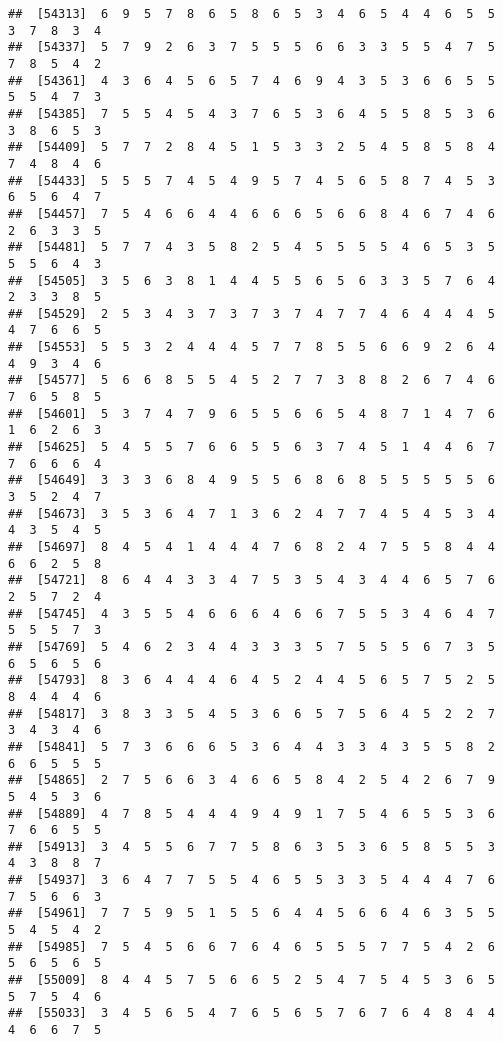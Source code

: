 \documentclass[
]{book}
\begin{document}
\begin{verbatim}
##  [54313]  6  9  5  7  8  6  5  8  6  5  3  4  6  5  4  4  6  5  5  3  7  8  3  4
##  [54337]  5  7  9  2  6  3  7  5  5  5  6  6  3  3  5  5  4  7  5  7  8  5  4  2
##  [54361]  4  3  6  4  5  6  5  7  4  6  9  4  3  5  3  6  6  5  5  5  5  4  7  3
##  [54385]  7  5  5  4  5  4  3  7  6  5  3  6  4  5  5  8  5  3  6  3  8  6  5  3
##  [54409]  5  7  7  2  8  4  5  1  5  3  3  2  5  4  5  8  5  8  4  7  4  8  4  6
##  [54433]  5  5  5  7  4  5  4  9  5  7  4  5  6  5  8  7  4  5  3  6  5  6  4  7
##  [54457]  7  5  4  6  6  4  4  6  6  6  5  6  6  8  4  6  7  4  6  2  6  3  3  5
##  [54481]  5  7  7  4  3  5  8  2  5  4  5  5  5  5  4  6  5  3  5  5  5  6  4  3
##  [54505]  3  5  6  3  8  1  4  4  5  5  6  5  6  3  3  5  7  6  4  2  3  3  8  5
##  [54529]  2  5  3  4  3  7  3  7  3  7  4  7  7  4  6  4  4  4  5  4  7  6  6  5
##  [54553]  5  5  3  2  4  4  4  5  7  7  8  5  5  6  6  9  2  6  4  4  9  3  4  6
##  [54577]  5  6  6  8  5  5  4  5  2  7  7  3  8  8  2  6  7  4  6  7  6  5  8  5
##  [54601]  5  3  7  4  7  9  6  5  5  6  6  5  4  8  7  1  4  7  6  1  6  2  6  3
##  [54625]  5  4  5  5  7  6  6  5  5  6  3  7  4  5  1  4  4  6  7  7  6  6  6  4
##  [54649]  3  3  3  6  8  4  9  5  5  6  8  6  8  5  5  5  5  5  6  3  5  2  4  7
##  [54673]  3  5  3  6  4  7  1  3  6  2  4  7  7  4  5  4  5  3  4  4  3  5  4  5
##  [54697]  8  4  5  4  1  4  4  4  7  6  8  2  4  7  5  5  8  4  4  6  6  2  5  8
##  [54721]  8  6  4  4  3  3  4  7  5  3  5  4  3  4  4  6  5  7  6  2  5  7  2  4
##  [54745]  4  3  5  5  4  6  6  6  4  6  6  7  5  5  3  4  6  4  7  5  5  5  7  3
##  [54769]  5  4  6  2  3  4  4  3  3  3  5  7  5  5  5  6  7  3  5  6  5  6  5  6
##  [54793]  8  3  6  4  4  4  6  4  5  2  4  4  5  6  5  7  5  2  5  8  4  4  4  6
##  [54817]  3  8  3  3  5  4  5  3  6  6  5  7  5  6  4  5  2  2  7  3  4  3  4  6
##  [54841]  5  7  3  6  6  6  5  3  6  4  4  3  3  4  3  5  5  8  2  6  6  5  5  5
##  [54865]  2  7  5  6  6  3  4  6  6  5  8  4  2  5  4  2  6  7  9  5  4  5  3  6
##  [54889]  4  7  8  5  4  4  4  9  4  9  1  7  5  4  6  5  5  3  6  7  6  6  5  5
##  [54913]  3  4  5  5  6  7  7  5  8  6  3  5  3  6  5  8  5  5  3  4  3  8  8  7
##  [54937]  3  6  4  7  7  5  5  4  6  5  5  3  3  5  4  4  4  7  6  7  5  6  6  3
##  [54961]  7  7  5  9  5  1  5  5  6  4  4  5  6  6  4  6  3  5  5  5  4  5  4  2
##  [54985]  7  5  4  5  6  6  7  6  4  6  5  5  5  7  7  5  4  2  6  5  6  5  6  5
##  [55009]  8  4  4  5  7  5  6  6  5  2  5  4  7  5  4  5  3  6  5  5  7  5  4  6
##  [55033]  3  4  5  6  5  4  7  6  5  6  5  7  6  7  6  4  8  4  4  4  6  6  7  5

\end{verbatim}
\end{document}
